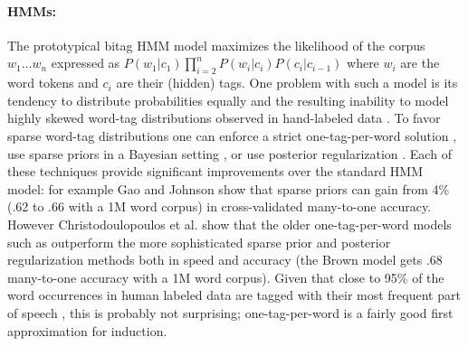 \paragraph{HMMs:}
The prototypical bitag HMM model maximizes the likelihood of the
corpus $w_1 \ldots w_n$ expressed as $P(w_1|c_1)\prod_{i=2}^n
P(w_i|c_i) P(c_i|c_{i-1})$ where $w_i$ are the word tokens and $c_i$
are their (hidden) tags.  One problem with such a model is its
tendency to distribute probabilities equally and the resulting
inability to model highly skewed word-tag distributions observed in
hand-labeled data \cite{johnson:2007:EMNLP-CoNLL2007}.  To favor
sparse word-tag distributions one can enforce a strict
one-tag-per-word solution
\cite{Brown:1992:CNG:176313.176316,Clark:2003:CDM:1067807.1067817},
use sparse priors in a Bayesian setting
\cite{goldwater-griffiths:2007:ACLMain,johnson:2007:EMNLP-CoNLL2007},
or use posterior regularization
\cite{Ganchev:2010:PRS:1859890.1859918}.  Each of these techniques
provide significant improvements over the standard HMM model: for
example Gao and Johnson  show
that sparse priors can gain from 4\% (.62 to .66 with a 1M word
corpus) in cross-validated many-to-one accuracy.  However
Christodoulopoulos et
al.  show that
the older one-tag-per-word models such as
\cite{Brown:1992:CNG:176313.176316} outperform the more sophisticated
sparse prior and posterior regularization methods both in speed and
accuracy (the Brown model gets .68 many-to-one accuracy with a 1M word
corpus).  Given that close to 95\% of the word occurrences in human
labeled data are tagged with their most frequent part of speech
\cite{Lee:2010:STU:1870658.1870741}, this is probably not surprising;
one-tag-per-word is a fairly good first approximation for induction.



